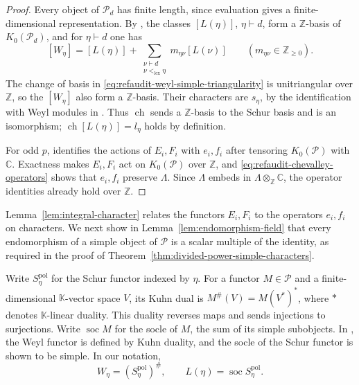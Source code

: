 \documentclass[12pt,reqno,a4paper]{amsart}
\numberwithin{equation}{section}
\numberwithin{figure}{section}
\theoremstyle{plain}
\theoremstyle{definition}
\newcommand{\cP}{\mathcal P}
\DeclareMathOperator{\ch}{ch}
\DeclareMathOperator{\soc}{soc}
\begin{document}
\begin{proof}
Every object of $\cP_d$ has finite length, since evaluation gives
a finite-dimensional representation.  By
\cite[Theorem~2(i) and the proof of Corollary~2]{HTY}, the classes
$[L(\eta)]$, $\eta\vdash d$, form a $\mathbb Z$-basis of
$K_0(\cP_d)$, and for $\eta\vdash d$ one has
\begin{equation}\label{eq:refaudit-weyl-simple-triangularity}
[W_\eta]=[L(\eta)]+
 \sum_{\substack{\nu\vdash d\\\nu<_{\mathrm{lex}}\eta}}
 m_{\eta\nu}[L(\nu)]
\qquad(m_{\eta\nu}\in\mathbb Z_{\geq0}).
\end{equation}
The change of basis in \eqref{eq:refaudit-weyl-simple-triangularity}
is unitriangular over $\mathbb Z$, so the $[W_\eta]$ also form a
$\mathbb Z$-basis.  Their characters are $s_\eta$, by the
identification with Weyl modules in \cite[Proposition~2(ii)]{HTY}.
Thus $\ch$ sends a $\mathbb Z$-basis to the Schur basis and is an
isomorphism; $\ch[L(\eta)]=l_\eta$ holds by definition.

For odd $p$, \cite[Proposition~7]{HTY} identifies
the actions of $E_i,F_i$ with $e_i,f_i$ after tensoring $K_0(\cP)$
with $\mathbb C$.
Exactness makes $E_i,F_i$ act on $K_0(\cP)$ over $\mathbb Z$,
and \eqref{eq:refaudit-chevalley-operators} shows that $e_i,f_i$
preserve $\Lambda$.  Since $\Lambda$ embeds in
$\Lambda\otimes_{\mathbb Z}\mathbb C$, the operator identities
already hold over $\mathbb Z$.
\end{proof}

Lemma~\ref{lem:integral-character} relates the functors $E_i,F_i$
to the operators $e_i,f_i$ on characters.  We next show in
Lemma~\ref{lem:endomorphism-field} that every endomorphism of a
simple object of $\cP$ is a scalar multiple of the identity, as
required in the proof of
Theorem~\ref{thm:divided-power-simple-characters}.

Write $S_\eta^{\mathrm{pol}}$ for the Schur functor indexed by $\eta$.
For a functor $M\in\cP$ and a finite-dimensional
$\mathbb K$-vector space $V$, its Kuhn dual is
$M^\#(V)=M(V^*)^*$, where $*$ denotes $\mathbb K$-linear duality.
This duality reverses maps and sends injections to surjections.
Write $\soc M$ for the socle of $M$, the sum of its simple subobjects.
In \cite[Definition~4(2)--(3) and Theorem~2(i)]{HTY}, the Weyl
functor is defined by Kuhn duality, and the socle of the Schur
functor is shown to be simple.  In our notation,
\[
W_\eta=(S_\eta^{\mathrm{pol}})^\#,
\qquad
L(\eta)=\soc S_\eta^{\mathrm{pol}}.
\]
\end{document}
